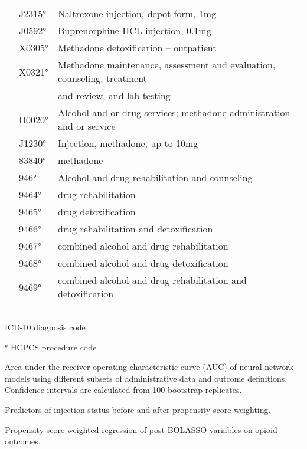 \documentclass[9pt,twoside]{pnas-new}
\begin{document}
\begin{table}
\begin{tabular}{lll}
 & J2315° & Naltrexone injection, depot form, 1mg \\
 & J0592° & Buprenorphine HCL injection, 0.1mg \\
 & X0305° & Methadone detoxification – outpatient \\
 & X0321° & Methadone maintenance, assessment and evaluation, counseling, treatment \\
 &  & and review, and lab testing \\
 & H0020° & Alcohol and or drug services; methadone administration and or service \\
 & J1230° & Injection, methadone, up to 10mg \\
 & 83840° & methadone \\
 & 946° & Alcohol and drug rehabilitation and counseling \\
 & 9464° & drug rehabilitation \\
 & 9465° & drug detoxification \\
 & 9466° & drug rehabilitation and detoxification \\
 & 9467° & combined alcohol and drug rehabilitation \\
 & 9468° & combined alcohol and drug detoxification \\
 & 9469° & combined alcohol and drug rehabilitation and detoxification \\[1em]
\end{tabular}
\hrule
\begin{tablenotes}
\footnotesize
\item * ICD-10 diagnosis code
\item ° HCPCS procedure code
\end{tablenotes}
\end{table}

\begin{table}
\caption{Area under the receiver-operating characteristic curve (AUC) of neural network models using different subsets of administrative data and outcome definitions. Confidence intervals are calculated from 100 bootstrap replicates.}
\centering

\end{table}

\begin{table}
\caption{Predictors of injection status before and after propensity score weighting.}
\centering

\end{table}

\begin{table}
\caption{Propensity score weighted regression of post-BOLASSO variables on opioid outcomes.}
\centering

\end{table}
\end{document}
